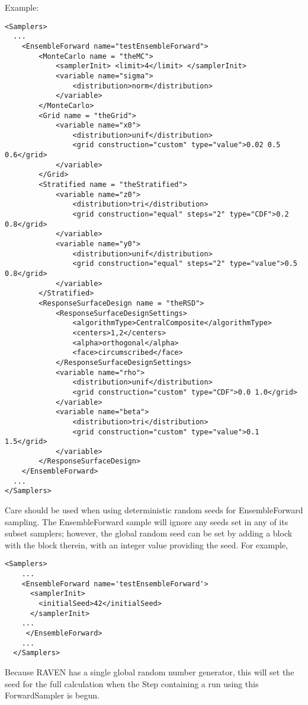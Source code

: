 Example:
\begin{lstlisting}[style=XML]
<Samplers>
  ...
    <EnsembleForward name="testEnsembleForward">
        <MonteCarlo name = "theMC">
            <samplerInit> <limit>4</limit> </samplerInit>
            <variable name="sigma">
                <distribution>norm</distribution>
            </variable>
        </MonteCarlo>
        <Grid name = "theGrid">
            <variable name="x0">
                <distribution>unif</distribution>
                <grid construction="custom" type="value">0.02 0.5 0.6</grid>
            </variable>
        </Grid>
        <Stratified name = "theStratified">
            <variable name="z0">
                <distribution>tri</distribution>
                <grid construction="equal" steps="2" type="CDF">0.2 0.8</grid>
            </variable>
            <variable name="y0">
                <distribution>unif</distribution>
                <grid construction="equal" steps="2" type="value">0.5 0.8</grid>
            </variable>
        </Stratified>
        <ResponseSurfaceDesign name = "theRSD">
            <ResponseSurfaceDesignSettings>
                <algorithmType>CentralComposite</algorithmType>
                <centers>1,2</centers>
                <alpha>orthogonal</alpha>
                <face>circumscribed</face>
            </ResponseSurfaceDesignSettings>
            <variable name="rho">
                <distribution>unif</distribution>
                <grid construction="custom" type="CDF">0.0 1.0</grid>
            </variable>
            <variable name="beta">
                <distribution>tri</distribution>
                <grid construction="custom" type="value">0.1 1.5</grid>
            </variable>
        </ResponseSurfaceDesign>
    </EnsembleForward>
  ...
</Samplers>
\end{lstlisting}

Care should be used when using deterministic random seeds for EnsembleForward sampling.  The EnsembleForward
sample will ignore any seeds set in any of its subset samplers; however, the global random seed can be set by
adding a  block with the  block therein, with an integer value
providing the seed.  For example,
\begin{lstlisting}[style=XML]
  <Samplers>
    ...
    <EnsembleForward name='testEnsembleForward'>
      <samplerInit>
        <initialSeed>42</initialSeed>
      </samplerInit>
    ...
     </EnsembleForward>
    ...
  </Samplers>
\end{lstlisting}
Because RAVEN has a single global random number generator, this will set the seed for the full calculation
when the Step containing a run using this ForwardSampler is begun.

